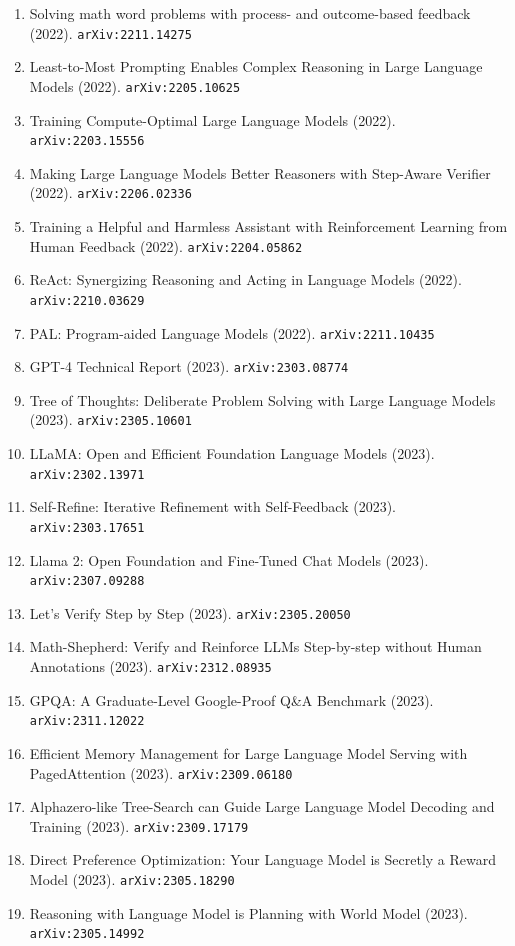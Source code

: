 \documentclass[11pt]{article}
\begin{document}
\begin{enumerate}
  \item Solving math word problems with process- and outcome-based feedback (2022). \texttt{arXiv:2211.14275}
  \item Least-to-Most Prompting Enables Complex Reasoning in Large Language
  Models (2022). \texttt{arXiv:2205.10625}
  \item Training Compute-Optimal Large Language Models (2022). \texttt{arXiv:2203.15556}
  \item Making Large Language Models Better Reasoners with Step-Aware Verifier (2022). \texttt{arXiv:2206.02336}
  \item Training a Helpful and Harmless Assistant with Reinforcement Learning
  from Human Feedback (2022). \texttt{arXiv:2204.05862}
  \item ReAct: Synergizing Reasoning and Acting in Language Models (2022). \texttt{arXiv:2210.03629}
  \item PAL: Program-aided Language Models (2022). \texttt{arXiv:2211.10435}
  \item GPT-4 Technical Report (2023). \texttt{arXiv:2303.08774}
  \item Tree of Thoughts: Deliberate Problem Solving with Large Language Models (2023). \texttt{arXiv:2305.10601}
  \item LLaMA: Open and Efficient Foundation Language Models (2023). \texttt{arXiv:2302.13971}
  \item Self-Refine: Iterative Refinement with Self-Feedback (2023). \texttt{arXiv:2303.17651}
  \item Llama 2: Open Foundation and Fine-Tuned Chat Models (2023). \texttt{arXiv:2307.09288}
  \item Let's Verify Step by Step (2023). \texttt{arXiv:2305.20050}
  \item Math-Shepherd: Verify and Reinforce LLMs Step-by-step without Human
  Annotations (2023). \texttt{arXiv:2312.08935}
  \item GPQA: A Graduate-Level Google-Proof Q\&A Benchmark (2023). \texttt{arXiv:2311.12022}
  \item Efficient Memory Management for Large Language Model Serving with
  PagedAttention (2023). \texttt{arXiv:2309.06180}
  \item Alphazero-like Tree-Search can Guide Large Language Model Decoding and
  Training (2023). \texttt{arXiv:2309.17179}
  \item Direct Preference Optimization: Your Language Model is Secretly a Reward
  Model (2023). \texttt{arXiv:2305.18290}
  \item Reasoning with Language Model is Planning with World Model (2023). \texttt{arXiv:2305.14992}

\end{enumerate}
\end{document}
